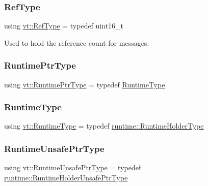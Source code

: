\subsubsection{\texorpdfstring{Ref\+Type}{RefType}}
{\footnotesize\ttfamily using \hyperlink{namespacevt_a60fda95dc2316580f0ccf87d570f1d9e}{vt\+::\+Ref\+Type} = typedef uint16\+\_\+t}



Used to hold the reference count for messages. 

\mbox{\label{namespacevt_a0ce60e0299d8fa32223b3b9ffa0af466}} 
\subsubsection{\texorpdfstring{Runtime\+Ptr\+Type}{RuntimePtrType}}
{\footnotesize\ttfamily using \hyperlink{namespacevt_a0ce60e0299d8fa32223b3b9ffa0af466}{vt\+::\+Runtime\+Ptr\+Type} = typedef \hyperlink{namespacevt_a5c1db2c048b259a2ba8961766ddb9278}{Runtime\+Type}}

\mbox{\label{namespacevt_a5c1db2c048b259a2ba8961766ddb9278}} 
\subsubsection{\texorpdfstring{Runtime\+Type}{RuntimeType}}
{\footnotesize\ttfamily using \hyperlink{namespacevt_a5c1db2c048b259a2ba8961766ddb9278}{vt\+::\+Runtime\+Type} = typedef \hyperlink{namespacevt_1_1runtime_ab09d044cce417fbcdb7e1e29b7aabbc3}{runtime\+::\+Runtime\+Holder\+Type}}

\mbox{\label{namespacevt_a8019b70cc4b9b0833c38559c85dfd53b}} 
\subsubsection{\texorpdfstring{Runtime\+Unsafe\+Ptr\+Type}{RuntimeUnsafePtrType}}
{\footnotesize\ttfamily using \hyperlink{namespacevt_a8019b70cc4b9b0833c38559c85dfd53b}{vt\+::\+Runtime\+Unsafe\+Ptr\+Type} = typedef \hyperlink{namespacevt_1_1runtime_a69931905b04961a874e4a70a43083a83}{runtime\+::\+Runtime\+Holder\+Unsafe\+Ptr\+Type}}

